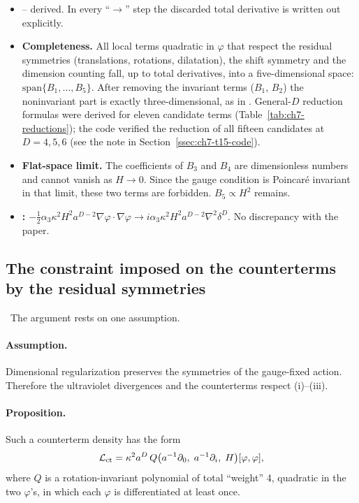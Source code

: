 \begin{resultbox}
\begin{itemize}[leftmargin=12pt]
\item {}-- derived. In every ``$\to$'' step the discarded total derivative is written out explicitly.
\item \textbf{Completeness.} All local terms quadratic in $\varphi$ that respect the residual symmetries (translations, rotations, dilatation), the shift symmetry and the dimension counting fall, up to total derivatives, into a five-dimensional space: $\mathrm{span}\{B_1,\ldots,B_5\}$.
After removing the invariant terms ($B_1$, $B_2$) the noninvariant part is exactly three-dimensional, as in .
General-$D$ reduction formulas were derived for eleven candidate terms (Table~\ref{tab:ch7-reductions}); the code verified the reduction of all fifteen candidates at $D=4,5,6$ (see the note in Section~\ref{ssec:ch7-t15-code}).
\item \textbf{Flat-space limit.} The coefficients of $B_3$ and $B_4$ are dimensionless numbers and cannot vanish as $H\to0$.
Since the gauge condition is Poincar\'e invariant in that limit, these two terms are forbidden. $B_5\propto H^2$ remains.
\item \textbf{:} $-\tfrac12\alpha_3\kappa^2H^2a^{D-2}\nabla\varphi\cdot\nabla\varphi\to i\alpha_3\kappa^2H^2a^{D-2}\nabla^2\delta^D$. \checkmark{} No discrepancy with the paper.
\end{itemize}
\end{resultbox}

\subsection{The constraint imposed on the counterterms by the residual symmetries}
\label{ssec:ch7-constraint}
\tD{}\,\tA{} The argument rests on one assumption.
\paragraph{Assumption.}
Dimensional regularization preserves the symmetries of the gauge-fixed action.
Therefore the ultraviolet divergences and the counterterms respect (i)--(iii).

\paragraph{Proposition.}
Such a counterterm density has the form
\begin{equation}
\mathcal{L}_{\mathrm{ct}}=\kappa^2a^D\,Q\big(a^{-1}\partial_0,\;a^{-1}\partial_i,\;H\big)[\varphi,\varphi],
\label{eq:ch7-ctform}
\end{equation}
where $Q$ is a rotation-invariant polynomial of total ``weight'' 4, quadratic in the two $\varphi$'s, in which each $\varphi$ is differentiated at least once.

